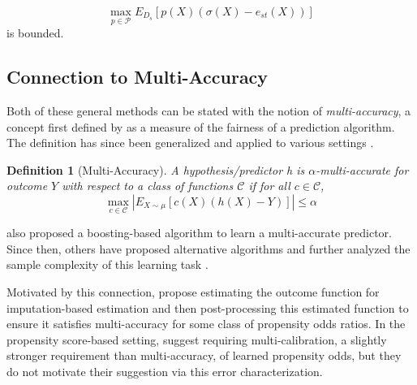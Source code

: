 \documentclass{article} %
\newtheorem{definition}{Definition}
\begin{document}
\begin{equation}
\label{pserror_forP}
    \max_{p\in\mathcal{P}}E_{D_s}[p(X)\left(\sigma(X) - e_{st}(X)\right)]
\end{equation}
is bounded. 

\subsection{Connection to Multi-Accuracy}
Both of these general methods can be stated with the notion of \emph{multi-accuracy}, a concept first defined by \cite{hebert2018multicalibration} as a measure of the fairness of a prediction algorithm. The definition has since been generalized and applied to various settings \citep{kim2022universal, gopalan2021omnipredictors, Gopalan2021importance}.

\begin{definition}[Multi-Accuracy]
A hypothesis/predictor h is $\alpha$-multi-accurate for outcome $Y$ with respect to a class of functions $\mathcal{C}$ if for all $c \in \mathcal{C}$,
$$\max_{c\in\mathcal{C}}|E_{X \sim \mu}[c(X)\left(h(X) - Y\right)]|\le \alpha$$
\end{definition}

\cite{hebert2018multicalibration} also proposed a boosting-based algorithm to learn a multi-accurate predictor. Since then, others have proposed alternative algorithms and further analyzed the sample complexity of this learning task \citep{hu2022metric}.

Motivated by this connection, \cite{kim2022universal} propose estimating the outcome function for imputation-based estimation and then post-processing this estimated function to ensure it satisfies multi-accuracy for some class of propensity odds ratios. In the propensity score-based setting, \cite{Gopalan2021importance} suggest requiring multi-calibration, a slightly stronger requirement than multi-accuracy, of learned propensity odds, but they do not motivate their suggestion via this error characterization.




\end{document}
